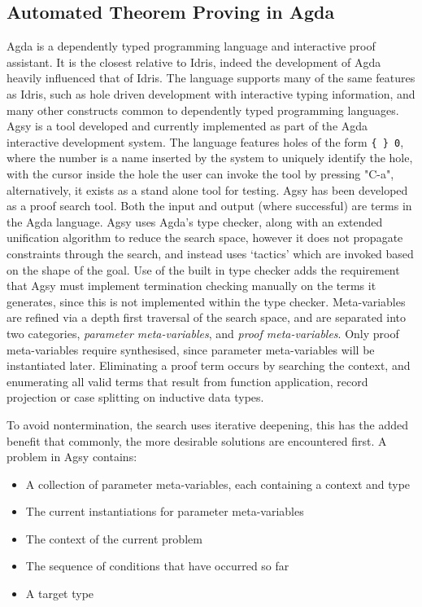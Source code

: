 \documentclass[a4paper]{article}
\begin{document}
\subsection{Automated Theorem Proving in Agda}
\label{sec:org9bbd902}
Agda is a dependently typed programming language and interactive proof 
assistant. It is the closest relative to Idris, indeed the development 
of Agda heavily influenced that of Idris. The language supports many
of the same features as Idris, such as hole driven development with 
interactive typing information, and many other constructs common to 
dependently typed programming languages. Agsy is a tool developed and 
currently implemented as part of the Agda interactive development system.
The language features holes of the form \texttt{\{ \} 0}, where the 
number is a name inserted by the system to uniquely identify the hole,
with the cursor inside the hole the user 
can invoke the tool by pressing "C-a", alternatively, it exists as a 
stand alone tool for testing. Agsy has been developed as a proof search 
tool. Both the input and output (where successful) are terms in the Agda 
language. Agsy uses Agda's type checker, along with an extended 
unification algorithm to reduce the search space, however it does not 
propagate constraints through the search, and instead uses `tactics' 
which are invoked based on the shape of the goal. Use of the built in 
type checker adds the requirement that Agsy must implement termination
checking manually on the terms it generates, since this is not 
implemented within the type checker. Meta-variables are refined via a 
depth first traversal of the search space, and are separated into 
two categories, \emph{parameter meta-variables}, and \emph{proof meta-variables}.
Only proof meta-variables require synthesised, since parameter 
meta-variables will be instantiated later. Eliminating a proof term
occurs by searching the context, and enumerating all valid terms that 
result from function application, record projection or case splitting on
inductive data types.

To avoid nontermination, the search uses iterative deepening, this has
the added benefit that commonly, the more desirable solutions are 
encountered first. A problem in Agsy contains:
\begin{itemize}
\item A collection of parameter meta-variables, each containing a context and type
\item The current instantiations for parameter meta-variables
\item The context of the current problem
\item The sequence of conditions that have occurred so far
\item A target type
\end{itemize}
\end{document}
